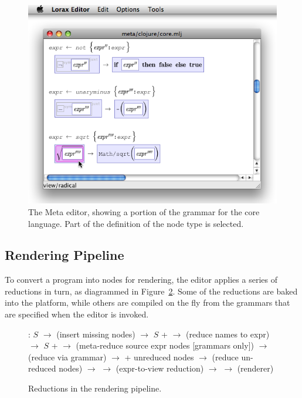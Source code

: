 \begin{figure}[ht]
  \includegraphics[scale=0.60]{src/image/editor.png}
  \caption{\label{fig-editor} The Meta editor, showing a portion of the grammar for the core language. Part of the definition of the  node type is selected.}
\end{figure}


\subsection{Rendering Pipeline}
To convert a program into  nodes for rendering, the editor applies a series of reductions in turn, as diagrammed in Figure~\ref{fig-pipeline}. Some of the reductions are baked into the platform, while others are compiled on the fly from the grammars that are specified when the editor is invoked. 

\begin{figure}[ht]

   : $S$ $\to$ (insert missing nodes) $\to$ $S$ +  $\to$ (reduce names to expr) $\to$ $S$ +  $\to$ (meta-reduce source expr nodes [grammars only]) $\to$ (reduce via grammar) $\to$  + unreduced nodes $\to$ (reduce un-reduced nodes) $\to$  $\to$ (expr-to-view reduction) $\to$  $\to$ (renderer)

  \caption{Reductions in the rendering pipeline.}
  \label{fig-pipeline} 
\end{figure}

